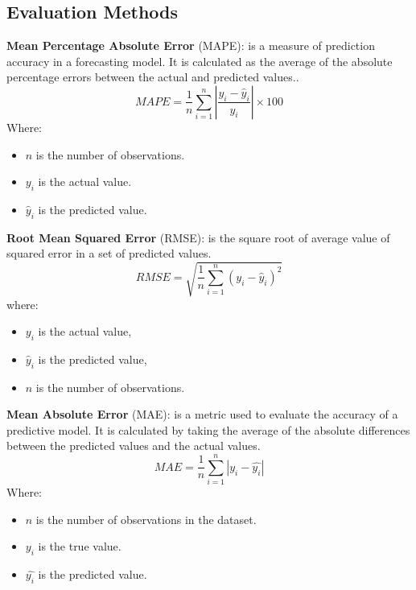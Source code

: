 \documentclass{ieeeojies}
\begin{document}
\subsection{Evaluation Methods}
\textbf{Mean Percentage Absolute Error} (MAPE): is a measure of prediction accuracy in a forecasting model. It is calculated as the average of the absolute percentage errors between the actual and predicted values..\\
\[
MAPE = \frac{1}{n} \sum_{i=1}^{n} \left| \frac{y_i - \hat{y}_i}{y_i} \right| \times 100
\]
Where:
\begin{itemize}
    \item \( n \) is the number of observations.
    \item \( y_i \) is the actual value.
    \item \( \hat{y}_i \) is the predicted value.
\end{itemize}
\textbf{Root Mean Squared Error} (RMSE): is the square root of average value of squared error in a set of predicted values.\\
\[RMSE = \sqrt{\frac{1}{n} \sum_{i=1}^{n} \left( y_i - \hat{y}_i \right)^2}\]
where:
\begin{itemize}
    \item \( y_i \) is the actual value,
    \item \( \hat{y}_i \) is the predicted value,
    \item \( n \) is the number of observations.
\end{itemize}
\textbf{Mean Absolute Error} (MAE): is a metric used to evaluate the accuracy of a predictive model. It is calculated by taking the average of the absolute differences between the predicted values and the actual values.\\
\[MAE=\frac{1}{n}  \sum_{i=1}^{n} |y_i-\hat{y_i} |\]
Where:
\begin{itemize}
	\item \(n\) is the number of observations in the dataset.
	\item \(y_i\)  is the true value.
	\item \(\hat{y_i}\) is the predicted value.
\end{itemize}
\end{document}
